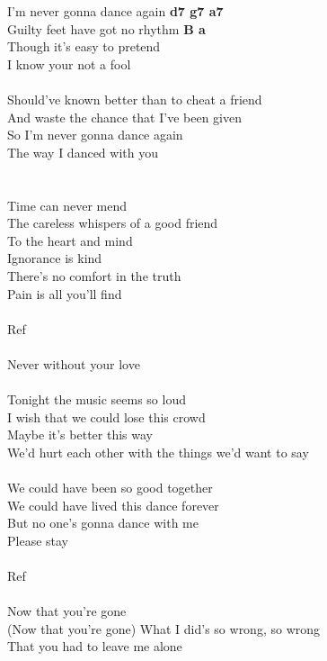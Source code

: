 I'm never gonna dance again \textbf{d7 g7 a7}\\
Guilty feet have got no rhythm \textbf{B a}\\
Though it's easy to pretend\\
I know your not a fool\\
\\
Should've known better than to cheat a friend\\
And waste the chance that I've been given\\
So I'm never gonna dance again\\
The way I danced with you\\
\\
\\
Time can never mend\\
The careless whispers of a good friend\\
To the heart and mind\\
Ignorance is kind\\
There's no comfort in the truth\\
Pain is all you'll find\\
\\
Ref\\
\\
Never without your love\\
\\
Tonight the music seems so loud\\
I wish that we could lose this crowd\\
Maybe it's better this way\\
We'd hurt each other with the things we'd want to say\\
\\
We could have been so good together\\
We could have lived this dance forever\\
But no one's gonna dance with me\\
Please stay\\
\\
Ref\\
\\
Now that you're gone\\
(Now that you're gone) What I did's so wrong, so wrong\\
That you had to leave me alone\\
\newpage


